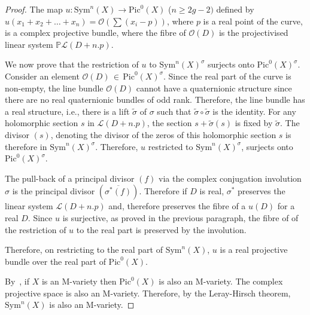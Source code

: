 \documentclass{article}
\theoremstyle{remark}
\begin{document}
\begin{proof}
  The map $u:\mathrm{Sym}^n(X) \to \mathrm{Pic}^0(X)$ ($n\geq 2g-2)$ defined by $u(x_1+x_2+\ldots+x_n) = \mathcal{O}(\sum (x_i - p))$, where $p$ is a real point of the curve, is a complex projective bundle, where the fibre of $\mathcal{O}(D)$ is the projectivised linear system $\mathbb{P}\mathcal{L}(D+n.p)$. 

  We now prove that the restriction of $u$ to $\mathrm{Sym}^n(X)^{\sigma}$ surjects onto $\mathrm{Pic}^0(X)^{\sigma}$. Consider an element $\mathcal{O}(D)\,\in\, \mathrm{Pic}^0(X)^{\sigma}$. Since the real part of the curve is non-empty, the line bundle $\mathcal{O}(D)$ cannot have a quaternionic structure since there are no real quaternionic bundles of odd rank. Therefore, the line bundle has a real structure, i.e., there is a lift $\widetilde{\sigma}$ of $\sigma$ such that $\widetilde{\sigma} \circ \widetilde{\sigma}$ is the identity.  For any holomorphic section $s$ in $\mathcal{L}(D+n.p)$, the section $s+\widetilde{\sigma}(s)$ is fixed by $\widetilde{\sigma}$. The divisor $(s)$, denoting the divisor of the zeros of this holomorphic section $s$ is therefore in $\mathrm{Sym}^{n}(X)^{\sigma}$. Therefore, $u$ restricted to $\mathrm{Sym}^n(X)^{\sigma}$, surjects onto $\mathrm{Pic}^0(X)^{\sigma}$. 
  
  The pull-back of a principal divisor  $(f)$ via the complex conjugation involution $\sigma$ is the principal divisor $(\overline{\sigma^*(f)})$. Therefore if $D$ is real, $\sigma^*$ preserves the linear system $\mathcal{L}(D+n.p)$ and, therefore preserves the fibre of a $u(D)$ for a real $D$. Since $u$ is surjective, as proved in the previous paragraph, the fibre of of the restriction of $u$ to the real part is preserved by the involution. 

  Therefore, on restricting to the real part of $\mathrm{Sym}^n(X)$, $u$ is a real projective bundle over the real part of $\mathrm{Pic}^0(X)$. 

By~\cite{biswas}, if $X$ is an M-variety then $\mathrm{Pic}^0(X)$ is also an M-variety. The complex projective space is also an M-variety. Therefore, by the Leray-Hirsch theorem, $\mathrm{Sym}^n(X)$ is also an M-variety.
\end{proof}
\end{document}
